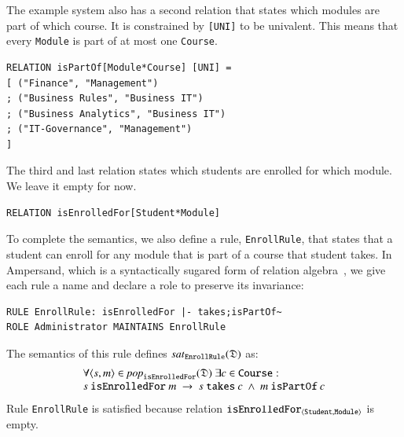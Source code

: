 \documentclass{elsarticle}
\begin{document}
   The example system also has a second relation that states which modules are part of which course.
   It is constrained by \verb-[UNI]- to be univalent.
   This means that every \verb-Module- is part of at most one \verb-Course-.
\begin{verbatim}
RELATION isPartOf[Module*Course] [UNI] =
[ ("Finance", "Management")
; ("Business Rules", "Business IT")
; ("Business Analytics", "Business IT")
; ("IT-Governance", "Management")
]
\end{verbatim}
   The third and last relation states which students are enrolled for which module.
   We leave it empty for now.
\begin{verbatim}
RELATION isEnrolledFor[Student*Module]
\end{verbatim}

   To complete the semantics,
   we also define a rule, {\tt EnrollRule}, that states that a student can enroll for any module that is part of a course that student takes.
   In Ampersand, which is a syntactically sugared form of relation algebra~\cite{JoostenRAMiCS2017},
   we give each rule a name and declare a role to preserve its invariance:
\begin{verbatim}
RULE EnrollRule: isEnrolledFor |- takes;isPartOf~
ROLE Administrator MAINTAINS EnrollRule
\end{verbatim}
   The semantics of this rule defines $\text{\it sat\/}_{\tt EnrollRule}(\mathfrak{D})$ as:
\begin{equation}
   \begin{array}{l}
   \forall \pair{s}{m}\in\pop{\tt isEnrolledFor}{\dataset}\ \exists c\in\text{\tt Course}:\\
s\ \text{\tt isEnrolledFor}\ m\ \rightarrow\ s\ \text{\tt takes}\ c\ \wedge\ m\ \text{\tt isPartOf}\ c
\end{array}
\label{eqn:example isEnrolledFor}
\end{equation}
   Rule {\tt EnrollRule} is satisfied because relation $\text{\it \tt isEnrolledFor\/}_{\langle{\tt Student},{\tt Module}\rangle}$ is empty.
\end{document}
